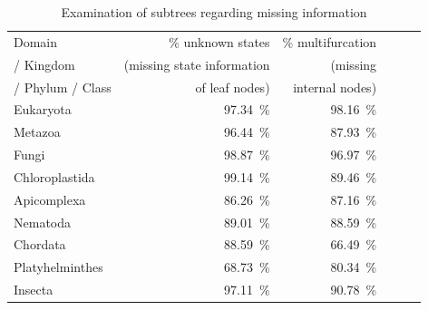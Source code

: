       \begin{table} [h]
        \begin{center}
          \begin{tabular}{ |l|r|r||r|r|r| }
            \hline
            Domain  & \% unknown states & \% multifurcation \\ 
            / Kingdom  & (missing state information & (missing \\
            / Phylum / Class & of leaf nodes) & internal nodes) \\
            \hline \hline
            Eukaryota       & 97.34~\%  & 98.16~\% \\
            \hline \hline
            Metazoa         & 96.44~\%  & 87.93~\% \\ \hline
            Fungi           & 98.87~\%  & 96.97~\% \\ \hline
            Chloroplastida  & 99.14~\%  & 89.46~\% \\
            \hline \hline            
            Apicomplexa     & 86.26~\%  & 87.16~\% \\ \hline
            Nematoda        & 89.01~\%  & 88.59~\% \\ \hline
            Chordata        & 88.59~\%  & \cellcolor{green!50}66.49~\% \\ \hline
            Platyhelminthes & \cellcolor{green!50}68.73~\%  & 80.34~\% \\
            \hline \hline            
            Insecta         & 97.11~\%  & 90.78~\% \\
            \hline  
          \end{tabular}
        \end{center}
        \caption{Examination of subtrees regarding missing information}
        \label{table:percentage loss information subtrees} 
      \end{table}

